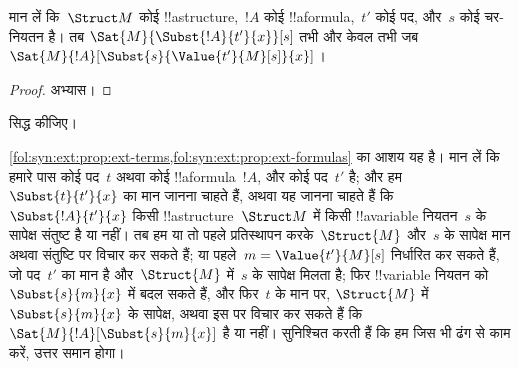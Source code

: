 \documentclass[../../../include/open-logic-section]{subfiles}
\begin{document}
\begin{prop} मान लें कि~$\Struct M$ कोई
!!a{structure},~$!A$ कोई !!a{formula},~$t'$ कोई पद, और~$s$ कोई चर-नियतन
है। तब $\Sat{M}{\Subst{!A}{t'}{x}}[s]$ तभी और केवल तभी जब
$\Sat{M}{!A}[\Subst{s}{\Value{t'}{M}[s]}{x}]$।
\end{prop}

\begin{proof}
अभ्यास।
\end{proof}

\begin{prob}
 सिद्ध कीजिए।
\end{prob}

\begin{explain}
  \cref{fol:syn:ext:prop:ext-terms,fol:syn:ext:prop:ext-formulas} का आशय
  यह है। मान लें कि हमारे पास कोई पद~$t$ अथवा कोई !!a{formula}~$!A$, और
  कोई पद~$t'$ है; और हम~$\Subst{t}{t'}{x}$ का मान जानना चाहते हैं, अथवा यह
  जानना चाहते हैं कि~$\Subst{!A}{t'}{x}$ किसी !!a{structure}~$\Struct M$
  में किसी !!a{variable} नियतन~$s$ के सापेक्ष संतुष्ट है या नहीं। तब हम या तो पहले
  प्रतिस्थापन करके~$\Struct{M}$ और~$s$ के सापेक्ष मान अथवा संतुष्टि पर
  विचार कर सकते हैं; या पहले~$m = \Value{t'}{M}[s]$ निर्धारित कर सकते हैं,
  जो पद~$t'$ का मान है और~$\Struct{M}$ में~$s$ के सापेक्ष मिलता है; फिर
  !!{variable} नियतन को~$\Subst{s}{m}{x}$ में बदल सकते हैं, और फिर~$t$ के मान पर,
  $\Struct{M}$ में~$\Subst{s}{m}{x}$ के सापेक्ष,
  अथवा इस पर विचार कर सकते हैं कि $\Sat{M}{!A}[\Subst{s}{m}{x}]$ है या
  नहीं।
  सुनिश्चित करती हैं कि हम जिस भी ढंग से काम करें, उत्तर समान होगा।
\end{explain}
\end{document}
